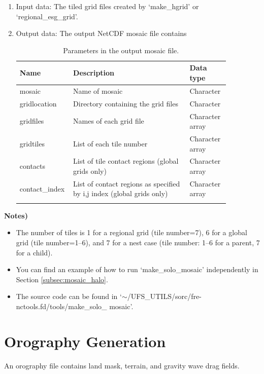 \documentclass[11pt,fleqn]{report}              %
\begin{document}
\begin{enumerate}
\begin{enumerate}
\item Input data: The tiled grid files created by `make\_hgrid' or `regional\_esg\_grid'.
\item Output data: The output NetCDF mosaic file contains
{
\fontsize{10}{12}\selectfont
\begin{longtable}{ p{0.15\linewidth} | p{0.53\linewidth} | p{0.18\linewidth} }
\hline
\hline
 Name & Description & Data type \\
\hline
 mosaic & Name of mosaic & Character \\
 gridlocation & Directory containing the grid files & Character \\
 gridfiles & Names of each grid file & Character array \\
 gridtiles & List of each tile number & Character array \\
 contacts & List of tile contact regions (global grids only) & Character array \\
 contact\_index & List of contact regions as specified by i,j index (global grids only) & Character array \\
\hline
\caption{Parameters in the output mosaic file.}
\label{table:mosaic_output}
\end{longtable}
}

\end{enumerate}



{\bf Notes)}
\begin{itemize}
\item The number of tiles is 1 for a regional grid (tile number=7), 6 for a global grid (tile number=1--6), and 7 for a nest case (tile number: 1--6 for a parent, 7 for a child).
\item You can find an example of how to run `make\_solo\_mosaic' independently in Section \ref{subsec:mosaic_halo}.
\item The source code can be found in `$\sim$/UFS\_UTILS/sorc/fre-nctools.fd/tools/make\_solo\_ mosaic'.
\end{itemize}

\end{enumerate}



\section{Orography Generation}
\label{sec:sar_pre_orog}

An orography file contains land mask, terrain, and gravity wave drag fields.
\end{document}
